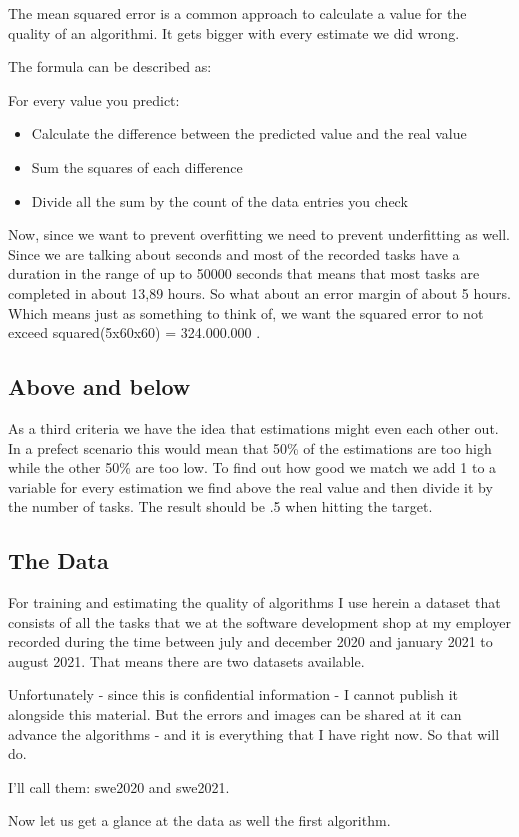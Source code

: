 The mean squared error is a common approach to calculate a value for the
quality of an algorithmi. It gets bigger with every estimate we did
wrong.

The formula can be described as:

For every value you predict:

\begin{itemize}
\tightlist
\item
  Calculate the difference between the predicted value and the real
  value
\item
  Sum the squares of each difference
\item
  Divide all the sum by the count of the data entries you check
\end{itemize}

Now, since we want to prevent overfitting we need to prevent
underfitting as well. Since we are talking about seconds and most of the
recorded tasks have a duration in the range of up to 50000 seconds that
means that most tasks are completed in about 13,89 hours. So what about
an error margin of about 5 hours. Which means just as something to think
of, we want the squared error to not exceed squared(5x60x60) =
324.000.000 .

\hypertarget{above-and-below}{%
\subsection{Above and below}\label{above-and-below}}

As a third criteria we have the idea that estimations might even each
other out. In a prefect scenario this would mean that 50\% of the
estimations are too high while the other 50\% are too low. To find out
how good we match we add 1 to a variable for every estimation we find
above the real value and then divide it by the number of tasks. The
result should be .5 when hitting the target.

\hypertarget{the-data}{%
\subsection{The Data}\label{the-data}}

For training and estimating the quality of algorithms I use herein a
dataset that consists of all the tasks that we at the software
development shop at my employer recorded during the time between july
and december 2020 and january 2021 to august 2021. That means there are
two datasets available.

Unfortunately - since this is confidential information - I cannot
publish it alongside this material. But the errors and images can be
shared at it can advance the algorithms - and it is everything that I
have right now. So that will do.

I'll call them: swe2020 and swe2021.

Now let us get a glance at the data as well the first algorithm.
